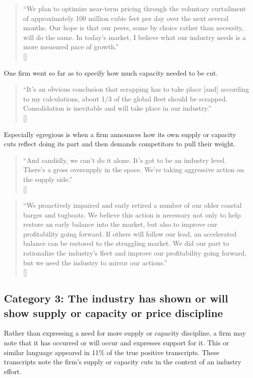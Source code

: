 \begin{quote}
``We plan to optimize near-term pricing through the voluntary curtailment of approximately 100 million cubic feet per day over the next several months. Our hope is that our peers, some by choice rather than necessity, will do the same. In today's market, I believe what our industry needs is a more measured pace of growth.'' \\
\mbox{[]}
\end{quote}

One firm went so far as to specify how much capacity needed to be cut.

\begin{quote}
``It's an obvious conclusion that scrapping has to take place [and] according to my calculations, about 1/3 of the global fleet should be scrapped. Consolidation is inevitable and will take place in our industry.'' \\
\mbox{[]}
\end{quote}


Especially egregious is when a firm announces how its own supply or capacity cuts reflect doing its part and then demands competitors to pull their weight.


\begin{quote}
``And candidly, we can't do it alone. It's got to be an industry level. There's a gross oversupply in the space. We're taking aggressive action on the supply side.'' \\
\mbox{[]}
\end{quote}


\begin{quote}
``We proactively impaired and early retired a number of our older coastal barges and tugboats. We believe this action is necessary not only to help restore an early balance into the market, but also to improve our profitability going forward. If others will follow our lead, an accelerated balance can be restored to the struggling market. We did our part to rationalize the industry's fleet and improve our profitability going forward, but we need the industry to mirror our actions.'' \\
\mbox{[]}
\end{quote}

\subsection{Category 3: The industry has shown or will show supply or capacity or price discipline}
Rather than expressing a need for more supply or capacity discipline, a firm may note that it has occurred or will occur and expresses support for it. This or similar language appeared in 11\% of the true positive transcripts. These transcripts note the firm's supply or capacity cuts in the context of an industry effort.

